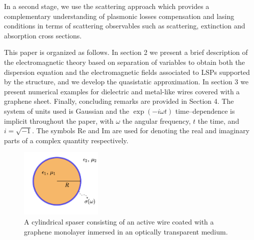 \documentclass[9pt,twocolumn,twoside]{osajnl}
\begin{document}
In a second stage, we use the scattering approach which provides a complementary understanding of plasmonic losses compensation and lasing conditions in terms of scattering observables such as scattering, extinction and absorption cross sections.  

%
%

This paper is organized as follows. In section 2 we present a brief description of the electromagnetic  theory based on separation of variables to obtain both the dispersion equation and the electromagnetic fields associated to LSPs supported  by the structure, and we develop the quasistatic approximation. In section 3  we present numerical examples for  dielectric and metal-like wires covered with a graphene sheet. 
Finally, concluding remarks are provided in Section 4. 
%
The system of units used is Gaussian and the $\exp(-i\omega t)$ time--dependence is implicit throughout the paper, 
with $\omega$ the angular frequency, $t$ the time, and $i=\sqrt{-1}$. The symbols {\rm Re \mit} and {\rm Im \mit} are used for denoting the real and imaginary parts of a complex quantity respectively. 


\begin{figure}[htbp]
    \centering
    \includegraphics[width=0.35\textwidth]{Leila1Figura1.png}
    \caption{A cylindrical spaser consisting of an active wire coated with a graphene monolayer inmersed in an optically transparent medium.}
    \label{dibujo}
\end{figure}
\end{document}
